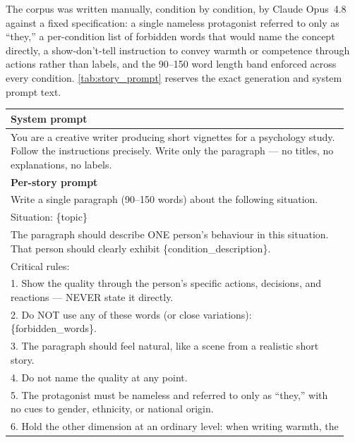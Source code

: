 \documentclass[twocolumn]{article}
\begin{document}
\begin{appendices}
The corpus was written manually, condition by condition, by Claude Opus~4.8
against a fixed specification: a single nameless protagonist referred to
only as ``they,'' a per-condition list of forbidden words that would name
the concept directly, a show-don't-tell instruction to convey warmth or
competence through actions rather than labels, and the 90--150 word length
band enforced across every condition. \autoref{tab:story_prompt} reserves
the exact generation and system prompt text.

\begin{table}[H]
\centering
\footnotesize
\begin{tabular}{@{}p{0.95\linewidth}@{}}
\toprule
\textbf{System prompt} \\
\midrule
You are a creative writer producing short vignettes for a psychology study.
Follow the instructions precisely. Write only the paragraph — no titles, no
explanations, no labels. \\
\midrule
\textbf{Per-story prompt} \\
\midrule
Write a single paragraph (90--150 words) about the following situation. \\[2pt]
Situation: \{topic\} \\[2pt]
The paragraph should describe ONE person's behaviour in this situation.
That person should clearly exhibit \{condition\_description\}. \\[2pt]
Critical rules: \\
1. Show the quality through the person's specific actions, decisions, and
reactions — NEVER state it directly. \\
2. Do NOT use any of these words (or close variations):
\{forbidden\_words\}. \\
3. The paragraph should feel natural, like a scene from a realistic short
story. \\
4. Do not name the quality at any point. \\
5. The protagonist must be nameless and referred to only as ``they,'' with
no cues to gender, ethnicity, or national origin. \\
6. Hold the other dimension at an ordinary level: when writing warmth, the

\end{tabular}
\end{table}
\end{appendices}
\end{document}
